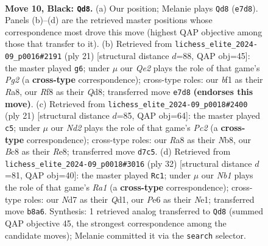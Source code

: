 \documentclass[11pt]{article}
\begin{document}
\clearpage

\begin{figure}[p]\centering
\begin{subfigure}{0.46\textwidth}\centering
\resizebox{\linewidth}{!}{%
\newchessgame
\chessboard[
  setfen={rnb2rk1/pppnqppp/4p3/3pP3/3P1P2/2N2Q2/PPP3PP/R3KBNR b KQ - 6 10},
  showmover=false,
  pgfstyle=straightmove, color=movearrow, markmove={e7-d8}
]}
\caption{}
\end{subfigure}\hfill
\begin{subfigure}{0.46\textwidth}\centering
\resizebox{\linewidth}{!}{%
\newchessgame
\chessboard[
  setfen={r2qkb1r/1p2nppp/p2p1n2/3Pp3/2P5/1N2BP2/PP4PP/R2QKB1R b KQkq - 0 11},
  showmover=false,
  pgfstyle=straightmove, color=movearrow, markmove={g7-g6}
]}
\caption{}
\end{subfigure}
\\[4pt]
\begin{subfigure}{0.46\textwidth}\centering
\resizebox{\linewidth}{!}{%
\newchessgame
\chessboard[
  setfen={rnb1r1k1/ppp1qppp/3p1n2/8/2PPp3/2N1P3/PPQNBPPP/R3K2R b KQ - 1 11},
  showmover=false,
  pgfstyle=straightmove, color=movearrow, markmove={c7-c5}
]}
\caption{}
\end{subfigure}\hfill
\begin{subfigure}{0.46\textwidth}\centering
\resizebox{\linewidth}{!}{%
\newchessgame
\chessboard[
  setfen={1rbqk1nr/5p2/p3p3/1pp1P2p/3nB1p1/1P6/PN1P1PPP/R2QNRK1 w k - 2 17},
  showmover=false,
  pgfstyle=straightmove, color=movearrow, markmove={a1-c1}
]}
\caption{}
\end{subfigure}
\caption{\textbf{Move 10, Black: \texttt{Qd8}.} (a) Our position; Melanie plays \texttt{Qd8} (\texttt{e7d8}). Panels (b)--(d) are the retrieved master positions whose correspondence most drove this move (highest QAP objective among those that transfer to it). (b) Retrieved from \texttt{lichess\_elite\_2024-09\_p0016\#2191} (ply 21) [structural distance $d$=88, QAP obj=45]: the master played \texttt{g6}; under $\mu$ our \emph{Qe2} plays the role of that game's \emph{Pg2} (a \textbf{cross-type} correspondence); cross-type roles: our \emph{b}f1 as their \emph{R}a8, our \emph{R}f8 as their \emph{Q}d8; transferred move \texttt{e7d8} \textbf{(endorses this move)}. (c) Retrieved from \texttt{lichess\_elite\_2024-09\_p0018\#2400} (ply 21) [structural distance $d$=85, QAP obj=64]: the master played \texttt{c5}; under $\mu$ our \emph{Nd2} plays the role of that game's \emph{Pc2} (a \textbf{cross-type} correspondence); cross-type roles: our \emph{R}a8 as their \emph{N}b8, our \emph{B}c8 as their \emph{R}e8; transferred move \texttt{d7c5}. (d) Retrieved from \texttt{lichess\_elite\_2024-09\_p0018\#3016} (ply 32) [structural distance $d$=81, QAP obj=40]: the master played \texttt{Rc1}; under $\mu$ our \emph{Nb1} plays the role of that game's \emph{Ra1} (a \textbf{cross-type} correspondence); cross-type roles: our \emph{N}d7 as their \emph{Q}d1, our \emph{P}e6 as their \emph{N}e1; transferred move \texttt{b8a6}. Synthesis: 1 retrieved analog transferred to \texttt{Qd8} (summed QAP objective 45, the strongest correspondence among the candidate moves); Melanie committed it via the \texttt{search} selector.}
\label{fig:thought-m19}
\end{figure}
\end{document}
